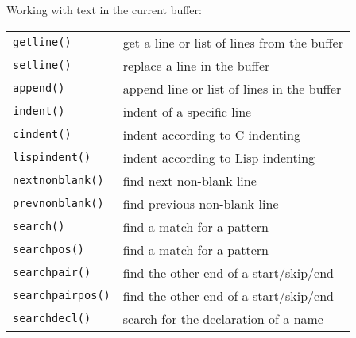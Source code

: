Working with text in the current buffer:
\label{text-functions}
\begin{center} \begin{tabular}{l l}
				\texttt{getline()} & get a line or list of lines from the buffer \\
				\texttt{setline()} & replace a line in the buffer \\
				\texttt{append()} & append line or list of lines in the buffer \\
				\texttt{indent()} & indent of a specific line \\
				\texttt{cindent()} & indent according to C indenting \\
				\texttt{lispindent()} & indent according to Lisp indenting \\
				\texttt{nextnonblank()} & find next non-blank line \\
				\texttt{prevnonblank()} & find previous non-blank line \\
				\texttt{search()} & find a match for a pattern \\
				\texttt{searchpos()} & find a match for a pattern \\
				\texttt{searchpair()} & find the other end of a start/skip/end \\
				\texttt{searchpairpos()} & find the other end of a start/skip/end \\
				\texttt{searchdecl()} & search for the declaration of a name \\
\end{tabular} \end{center}

